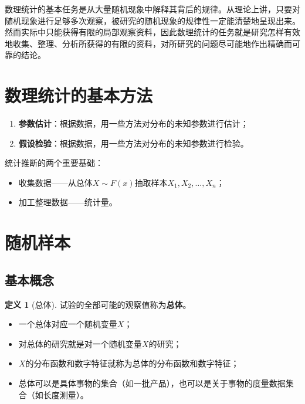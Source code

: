 \documentclass[11pt,a4paper]{report}
\theoremstyle{definition}
\newtheorem{definition}{定义}[chapter]
\begin{document}
数理统计的基本任务是从大量随机现象中解释其背后的规律。从理论上讲，只要对随机现象进行足够多次观察，被研究的随机现象的规律性一定能清楚地呈现出来。然而实际中只能获得有限的局部观察资料，因此数理统计的任务就是研究怎样有效地收集、整理、分析所获得的有限的资料，对所研究的问题尽可能地作出精确而可靠的结论。

\section*{数理统计的基本方法}

\begin{enumerate}[label=\arabic*.,leftmargin=2em]
    \item \textbf{参数估计}：根据数据，用一些方法对分布的未知参数进行估计；
    \item \textbf{假设检验}：根据数据，用一些方法对分布的未知参数进行检验。
\end{enumerate}

统计推断的两个重要基础：
\begin{itemize}[leftmargin=2em]
    \item 收集数据——从总体$X\sim F(x)$抽取样本$X_{1},X_{2},\ldots,X_{n}$；
    \item 加工整理数据——统计量。
\end{itemize}

\section{随机样本}

\subsection{基本概念}

\begin{definition}[总体]
试验的全部可能的观察值称为\textbf{总体}。
\begin{itemize}[leftmargin=2em]
    \item 一个总体对应一个随机变量$X$；
    \item 对总体的研究就是对一个随机变量$X$的研究；
    \item $X$的分布函数和数字特征就称为总体的分布函数和数字特征；
    \item 总体可以是具体事物的集合（如一批产品），也可以是关于事物的度量数据集合（如长度测量）。
\end{itemize}
\end{definition}
\end{document}
